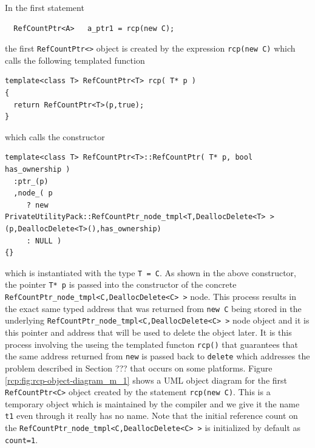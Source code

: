 In the first statement
%
{\scriptsize\begin{verbatim}
  RefCountPtr<A>   a_ptr1 = rcp(new C);
\end{verbatim}}
%
{}\noindent{}the first {}\texttt{Ref\-Count\-Ptr<>} object is created
by the expression {}\texttt{rcp(new C)} which calls the following
templated function
%
{\scriptsize\begin{verbatim}
template<class T> RefCountPtr<T> rcp( T* p )
{
  return RefCountPtr<T>(p,true);
}
\end{verbatim}}
%
{}\noindent{}which calls the constructor
%
{\scriptsize\begin{verbatim}
template<class T> RefCountPtr<T>::RefCountPtr( T* p, bool has_ownership )
  :ptr_(p)
  ,node_( p
     ? new PrivateUtilityPack::RefCountPtr_node_tmpl<T,DeallocDelete<T> >(p,DeallocDelete<T>(),has_ownership)
     : NULL )
{}
\end{verbatim}}
%
{}\noindent{}which is instantiated with the type {}\texttt{T = C}.
As shown in the above constructor, the pointer {}\texttt{T* p} is
passed into the constructor of the concrete
{}\texttt{Ref\-Count\-Ptr\-\_node\-\_tmpl<\-C\-,Dealloc\-Delete<C> >}
node.  This process results in the exact same typed address that was
returned from {}\texttt{new C} being stored in the underlying
{}\texttt{Ref\-Count\-Ptr\-\_node\-\_tmpl<\-C\-,Dealloc\-Delete<C> >} node
object and it is this pointer and address that will be used to delete
the object later.  It is this process involving the useing the
templated functon {}\texttt{rcp()} that guarantees that the same
address returned from {}\texttt{new} is passed back to
{}\texttt{delete} which addresses the problem described in Section ???
that occurs on some platforms.  Figure
{}\ref{rcp:fig:rcp-object-diagram_m_1} shows a UML object diagram for
the first {}\texttt{Ref\-Count\-Ptr<C>} object created by the statement
{}\texttt{rcp(new C)}.  This is a temporary object which is maintained
by the compiler and we give it the name {}\texttt{t1} even through it
really has no name.  Note that the initial reference count on the
{}\texttt{Ref\-Count\-Ptr\-\_node\-\_tmpl<\-C,\-Dealloc\-Delete<C> >} is
initialized by default as {}\texttt{count=1}.

